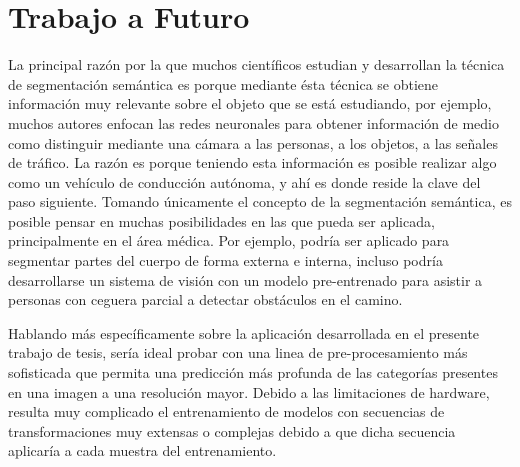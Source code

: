 \section{Trabajo a Futuro}
La principal razón por la que muchos científicos estudian y desarrollan la técnica de segmentación semántica es porque mediante ésta técnica se obtiene información muy relevante sobre el objeto que se está estudiando, por ejemplo, muchos autores enfocan las redes neuronales para obtener información de medio como distinguir mediante una cámara a las personas, a los objetos, a las señales de tráfico. La razón es porque teniendo esta información es posible realizar algo como un vehículo de conducción autónoma, y ahí es donde reside la clave del paso siguiente. Tomando únicamente el concepto de la segmentación semántica, es posible pensar en muchas posibilidades en las que pueda ser aplicada, principalmente en el área médica. Por ejemplo, podría ser aplicado para segmentar partes del cuerpo de forma externa e interna, incluso podría desarrollarse un sistema de visión con un modelo pre-entrenado para asistir a personas con ceguera parcial a detectar obstáculos en el camino.


Hablando más específicamente sobre la aplicación desarrollada en el presente trabajo de tesis, sería ideal probar con una linea de pre-procesamiento más sofisticada que permita una predicción más profunda de las categorías presentes en una imagen a una resolución mayor. Debido a las limitaciones de hardware, resulta muy complicado el entrenamiento de modelos con secuencias de transformaciones muy extensas o complejas debido a que dicha secuencia aplicaría a cada muestra del entrenamiento. 



\nocite{*}